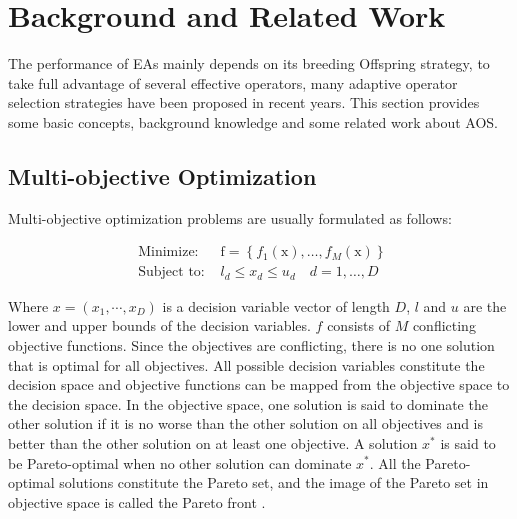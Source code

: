 \documentclass[journal]{IEEEtran}
\begin{document}
\IEEEpubidadjcol

\section{Background and Related Work}
The performance of EAs mainly depends on its breeding Offspring strategy, to take full advantage of several effective operators, many adaptive operator selection strategies have been proposed in recent years.
This section provides some basic concepts, background knowledge and some related work about AOS.

\subsection{Multi-objective Optimization}
Multi-objective optimization problems are usually formulated as follows:

\begin{equation}
  \begin{array}{ll}
    \text { Minimize: }   & \mathrm{f}=\left\{f_{1}(\mathrm{x}), \ldots, f_{M}(\mathrm{x})\right\} \\
    \text { Subject to: } & l_{d} \leq x_{d} \leq u_{d} \quad d=1, \ldots, D
  \end{array}
  \label{eq: moea}
\end{equation}

Where $x = (x_1, \cdots , x_D)$ is a decision variable vector of length $D$, $l$ and $u$ are the lower and upper bounds of the decision variables. $f$ consists of $M$ conflicting objective functions. Since the objectives are conflicting, there is no one solution that is optimal for all objectives.
All possible decision variables constitute the decision space and objective functions can be mapped from the objective space to the decision space\cite{gonccalves2017adaptive}. In the objective space, one solution is said to dominate the other solution if it is no worse than the other solution on all objectives and is better than the other solution on at least one objective.
A solution $x^*$ is said to be Pareto-optimal when no other solution can dominate $x^*$. All the Pareto-optimal solutions constitute the Pareto set, and the image of the Pareto set in objective space is called the Pareto front \cite{deb2001multi}.
\end{document}
